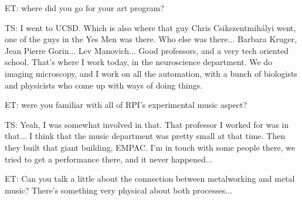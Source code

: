 ET: where did you go for your art program? 

TS: I went to UCSD. Which is also where that guy Chris Csikszentmihályi went, one of the guys in the Yes Men was there. Who else was there... Barbara Kruger, Jean Pierre Gorin... Lev Manovich... Good professors, and a very tech oriented school. That's where I work today, in the neuroscience department. We do imaging microscopy, and I work on all the automation, with a bunch of biologists and physicists who come up with ways of doing things. 

ET: were you familiar with all of RPI's experimental music aspect? 

TS: Yeah, I was somewhat involved in that. That professor I worked for was in that... I think that the music department was pretty small at that time. Then they built that giant building, EMPAC. I'm in touch with some people there, we tried to get a performance there, and it never happened... 

ET: Can you talk a little about the connection between metalworking and metal music? There's something very physical about both processes...

